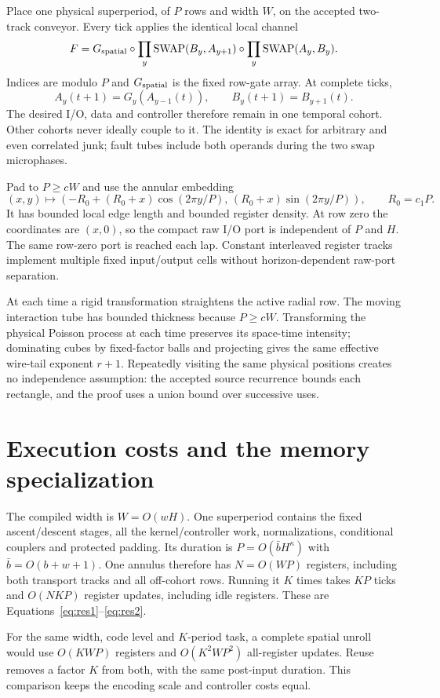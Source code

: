 \documentclass[11pt]{article}
\newcommand{\SWAP}{\operatorname{SWAP}}
\begin{document}
Place one physical superperiod, of $P$ rows and width $W$, on the accepted
two-track conveyor. Every tick applies the identical local channel
\[
 F=G_{\rm spatial}\circ
   \prod_y\SWAP(B_y,A_{y+1})\circ
   \prod_y\SWAP(A_y,B_y).
\]
Indices are modulo $P$ and $G_{\rm spatial}$ is the fixed row-gate array.
At complete ticks,
\[
 A_y(t+1)=G_y(A_{y-1}(t)),\qquad
 B_y(t+1)=B_{y+1}(t).
\]
The desired I/O, data and controller therefore remain in one temporal
cohort. Other cohorts never ideally couple to it. The identity is exact
for arbitrary and even correlated junk; fault tubes include both
operands during the two swap microphases.

Pad to $P\geq cW$ and use the annular embedding
\[
 (x,y)\longmapsto
 (-R_0+(R_0+x)\cos(2\pi y/P),\,
        (R_0+x)\sin(2\pi y/P)),\qquad R_0=c_1P.
\]
It has bounded local edge length and bounded register density. At row
zero the coordinates are $(x,0)$, so the compact raw I/O port is independent
of $P$ and $H$. The same row-zero port is reached each lap. Constant
interleaved register tracks implement multiple fixed input/output cells
without horizon-dependent raw-port separation.

At each time a rigid transformation straightens the active radial row.
The moving interaction tube has bounded thickness because $P\geq cW$.
Transforming the physical Poisson process at each time preserves its
space-time intensity; dominating cubes by fixed-factor balls and
projecting gives the same effective wire-tail exponent $r+1$. Repeatedly
visiting the same physical positions creates no independence assumption:
the accepted source recurrence bounds each rectangle, and the proof
uses a union bound over successive uses.

\section{Execution costs and the memory specialization}

The compiled width is $W=O(wH)$. One superperiod contains the fixed
ascent/descent stages, all the kernel/controller work, normalizations,
conditional couplers and protected padding. Its duration is
$P=O(\bar bH^\kappa)$ with $\bar b=O(b+w+1)$.
One annulus therefore has $N=O(WP)$ registers, including both transport
tracks and all off-cohort rows. Running it $K$ times takes $KP$ ticks and
$O(NKP)$ register updates, including idle registers. These are
Equations~\eqref{eq:res1}--\eqref{eq:res2}.

For the same width, code level and $K$-period task, a complete spatial
unroll would use $O(KWP)$ registers and $O(K^2WP^2)$ all-register updates.
Reuse removes a factor $K$ from both, with the same post-input duration.
This comparison keeps the encoding scale and controller costs equal.
\end{document}
